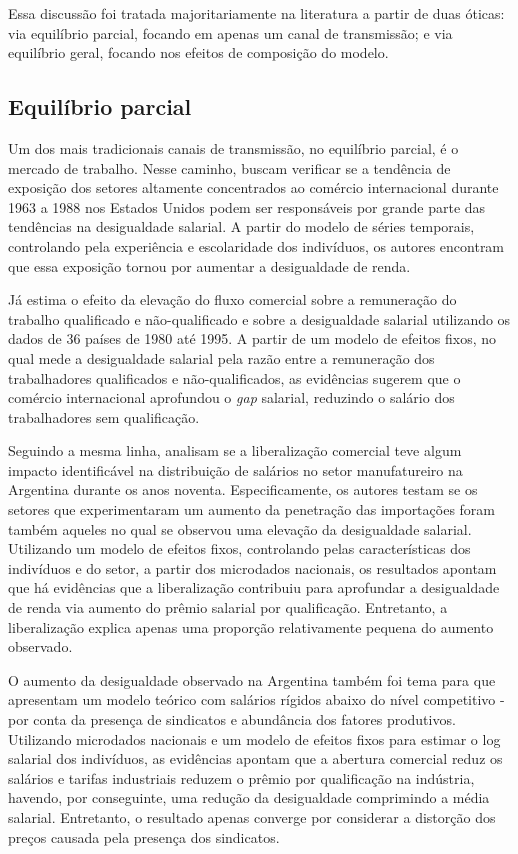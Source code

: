Essa discussão foi tratada majoritariamente na literatura a partir de duas óticas: via equilíbrio parcial, focando em apenas um canal de transmissão; e via equilíbrio geral, focando nos efeitos de composição do modelo.

\subsection{Equilíbrio parcial} \label{subsec:eq_parcial}

Um dos mais tradicionais canais de transmissão, no equilíbrio parcial, é o mercado de trabalho. Nesse caminho, \textcite{borjas94} buscam verificar se a tendência de exposição dos setores altamente concentrados ao comércio internacional durante 1963 a 1988 nos Estados Unidos podem ser responsáveis por grande parte das tendências na desigualdade salarial. A partir do modelo de séries temporais, controlando pela experiência e escolaridade dos indivíduos, os autores encontram que essa exposição tornou por aumentar a desigualdade de renda.

Já \textcite{forbes01} estima o efeito da elevação do fluxo comercial sobre a remuneração do trabalho qualificado e não-qualificado e sobre a desigualdade salarial utilizando os dados de 36 países de 1980 até 1995. A partir de um modelo de efeitos fixos, no qual mede a desigualdade salarial pela razão entre a remuneração dos trabalhadores qualificados e não-qualificados, as evidências sugerem que o comércio internacional aprofundou o \textit{gap} salarial, reduzindo o salário dos trabalhadores sem qualificação.

Seguindo a mesma linha, \textcite{galianisanguinetti03} analisam se a liberalização comercial teve algum impacto identificável na distribuição de salários no setor manufatureiro na Argentina durante os anos noventa. Especificamente, os autores testam se os setores que experimentaram um aumento da penetração das importações foram também aqueles no qual se observou uma elevação da desigualdade salarial. Utilizando um modelo de efeitos fixos, controlando pelas características dos indivíduos e do setor, a partir dos microdados nacionais, os resultados apontam que há evidências que a liberalização contribuiu para aprofundar a desigualdade de renda via aumento do prêmio salarial por qualificação. Entretanto, a liberalização explica apenas uma proporção relativamente pequena do aumento observado.

O aumento da desigualdade observado na Argentina também foi tema para \textcite{galianiporto11} que apresentam um modelo teórico com salários rígidos abaixo do nível competitivo - por conta da presença de sindicatos e abundância dos fatores produtivos. Utilizando microdados nacionais e um modelo de efeitos fixos para estimar o log salarial dos indivíduos, as evidências apontam que a abertura comercial reduz os salários e tarifas industriais reduzem o prêmio por qualificação na indústria, havendo, por conseguinte, uma redução da desigualdade comprimindo a média salarial. Entretanto, o resultado apenas converge por considerar a distorção dos preços causada pela presença dos sindicatos.

